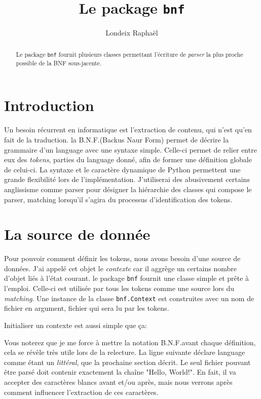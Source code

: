 \documentclass[a4paper]{article}
\title{Le package \texttt{bnf}}
\author{Londeix Raphaël}
\newcommand{\insertpython}[1]{%
{\ttfamily}%
}
\newcommand{\fixed}[1]{\texttt{#1}}
\newcommand{\bnf}{B.N.F.}
\begin{document}
    \maketitle

    \begin{abstract}
        Le package \fixed{bnf} fournit plusieurs classes permettant
        l'écriture de \textit{parser} la plus proche possible de la
        BNF sous-jacente.
    \end{abstract}

    \section{Introduction}
        Un besoin récurrent en informatique est l'extraction de contenu,
        qui n'est qu'en fait de la traduction. la \bnf (Backus Naur Form)
        permet de décrire la grammaire d'un language avec une syntaxe simple.
        Celle-ci permet de relier entre eux des \textit{tokens},
        parties du language donné, afin de former une définition globale
        de celui-ci. La syntaxe et le caractère dynamique de Python permettent
        une grande flexibilité lors de l'implémentation. J'utiliserai des
        abusivement certains anglissisme comme parser pour désigner
        la hiérarchie des classes qui compose le parser, matching lorsqu'il
        s'agira du processus d'identification des tokens.


    \section{La source de donnée}
        Pour pouvoir comment définir les tokens, nous avons besoin d'une
        source de données. J'ai appelé cet objet le \textit{contexte} car
        il aggrège un certains nombre d'objet liés à l'état courant. le
        package \fixed{bnf} fournit une classe simple et prête à l'emploi.
        Celle-ci est utilisée par tous les tokens comme une source lors
        du \textit{matching}. Une instance de la classe \fixed{bnf.Context} est
        construites avec un nom de fichier en argument, fichier qui sera
        lu par les tokens.

        Initialiser un contexte est aussi simple que ça:
        \insertpython{listings/bnf/ex01.py}

        Vous noterez que je me force à mettre la notation \bnf avant chaque
        définition, cela se révèle très utile lors de la relecture. La ligne
        suivante déclare language comme étant un \textit{littéral}, que la
        prochaine section décrit. Le seul fichier pouvant être parsé doit
        contenir exactement la chaîne "Hello, World!". En fait, il va
        accepter des caractères blancs avant et/ou après, mais nous verrons
        après comment influencer l'extraction de ces caractères.
\end{document}
